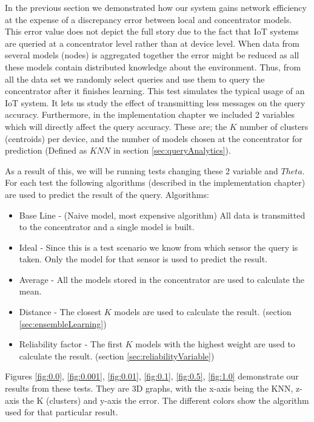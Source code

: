 \documentclass{mproj}
\begin{document}
In the previous section we demonstrated how our system gains network efficiency at the expense of a discrepancy error between local and concentrator models. This error value does not depict the full story due to the fact that IoT systems are queried at a concentrator level rather than at device level. When data from several models (nodes) is aggregated together the error might be reduced as all these models contain distributed knowledge about the environment. Thus, from all the data set we randomly select queries and use them to query the concentrator after it finishes learning. This test simulates the typical usage of an IoT system. It lets us study the effect of transmitting less messages on the query accuracy. Furthermore, in the implementation chapter we included 2 variables which will directly affect the query accuracy. These are; the $K$ number of clusters (centroids) per device, and the number of models chosen at the concentrator for prediction (Defined as $KNN$ in section \ref{sec:queryAnalytics}).

As a result of this, we will be running tests changing these 2 variable and $Theta$. For each test the following algorithms (described in the implementation chapter) are used to predict the result of the query. Algorithms:

\begin{itemize}
\item Base Line - (Naive model, most expensive algorithm) All data is transmitted to the concentrator and a single model is built.
\item Ideal - Since this is a test scenario we know from which sensor the query is taken. Only the model for that sensor is used to predict the result.
\item Average - All the models stored in the concentrator are used to calculate the mean.
\item Distance - The closest $K$ models are used to calculate the result. (section \ref{sec:ensembleLearning})
\item Reliability factor - The first $K$ models with the highest weight are used to calculate the result. (section \ref{sec:reliabilityVariable})
\end{itemize}

Figures \ref{fig:0.0}, \ref{fig:0.001}, \ref{fig:0.01}, \ref{fig:0.1}, \ref{fig:0.5}, \ref{fig:1.0} demonstrate our results from these tests. They are 3D graphs, with the x-axis being the KNN, z-axis the K (clusters) and y-axis the error. The different colors show the algorithm used for that particular result. 
\end{document}
